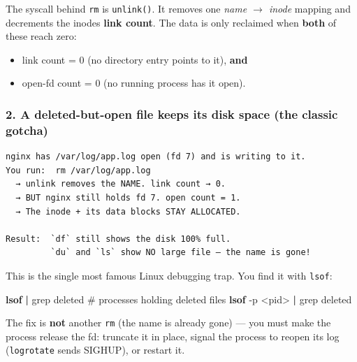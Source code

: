 \documentclass[11pt]{article}
\providecommand{\tightlist}{\setlength{\itemsep}{1pt}\setlength{\parskip}{0pt}}
\newenvironment{Shaded}{\begin{snugshade}}{\end{snugshade}}
\newcommand{\AttributeTok}[1]{\textcolor[rgb]{0.16,0.50,0.73}{#1}}
\newcommand{\CommentTok}[1]{\textcolor[rgb]{0.48,0.49,0.49}{#1}}
\newcommand{\ExtensionTok}[1]{\textcolor[rgb]{0.00,0.60,1.00}{\textbf{#1}}}
\newcommand{\FunctionTok}[1]{\textcolor[rgb]{0.56,0.27,0.68}{#1}}
\newcommand{\KeywordTok}[1]{\textcolor[rgb]{0.81,0.81,0.76}{\textbf{#1}}}
\newcommand{\NormalTok}[1]{\textcolor[rgb]{0.81,0.81,0.76}{#1}}
\newcommand{\OperatorTok}[1]{\textcolor[rgb]{0.81,0.81,0.76}{#1}}
\begin{document}
The syscall behind \texttt{rm} is \texttt{unlink()}. It removes one \emph{name \(\rightarrow\) inode} mapping and decrements the inode\textquotesingle s \textbf{link count}. The data is only reclaimed when \textbf{both} of these reach zero:

\begin{itemize}
\tightlist
\item
  link count = 0 (no directory entry points to it), \textbf{and}
\item
  open-fd count = 0 (no running process has it open).
\end{itemize}

\subsubsection{2. A deleted-but-open file keeps its disk space (the classic gotcha)}\label{2-a-deleted-but-open-file-keeps-its-disk-space-the-classic-gotcha}

\setcodelang{}

\begin{verbatim}
nginx has /var/log/app.log open (fd 7) and is writing to it.
You run:  rm /var/log/app.log
  → unlink removes the NAME. link count → 0.
  → BUT nginx still holds fd 7. open count = 1.
  → The inode + its data blocks STAY ALLOCATED.

Result:  `df` still shows the disk 100% full.
         `du` and `ls` show NO large file — the name is gone!
\end{verbatim}

This is the single most famous Linux debugging trap. You find it with \texttt{lsof}:


\begin{Shaded}
\begin{Highlighting}[]
\ExtensionTok{lsof} \KeywordTok{|} \FunctionTok{grep}\NormalTok{ deleted          }\CommentTok{\# processes holding deleted files}
\ExtensionTok{lsof} \AttributeTok{{-}p} \OperatorTok{\textless{}}\NormalTok{pid}\OperatorTok{\textgreater{}} \KeywordTok{|} \FunctionTok{grep}\NormalTok{ deleted}
\end{Highlighting}
\end{Shaded}

The fix is \textbf{not} another \texttt{rm} (the name is already gone) --- you must make the process release the fd: truncate it in place, signal the process to reopen its log (\texttt{logrotate} sends SIGHUP), or restart it.
\end{document}

